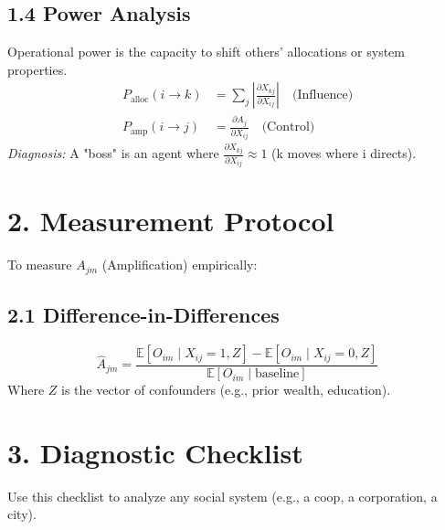 \documentclass{article}
\begin{document}
\subsection*{1.4 Power Analysis}
Operational power is the capacity to shift others' allocations or system properties.
\begin{align}
P_{\text{alloc}} (i \to k) &= \sum_j \left| \frac{\partial X_{kj}}{\partial X_{ij}} \right| \quad \text{(Influence)} \\
P_{\text{amp}} (i \to j) &= \frac{\partial A_j}{\partial X_{ij}} \quad \text{(Control)}
\end{align}
\textit{Diagnosis:} A "boss" is an agent where $\frac{\partial X_{kj}}{\partial X_{ij}} \approx 1$ (k moves where i directs).

\section*{2. Measurement Protocol}

To measure $A_{jm}$ (Amplification) empirically:

\subsection*{2.1 Difference-in-Differences}
\begin{equation}
\hat{A}_{jm} = \frac{\mathbb{E}[O_{im} \mid X_{ij}=1, Z] - \mathbb{E}[O_{im} \mid X_{ij}=0, Z]}{\mathbb{E}[O_{im} \mid \text{baseline}]}
\end{equation}
Where $Z$ is the vector of confounders (e.g., prior wealth, education).

\section*{3. Diagnostic Checklist}

Use this checklist to analyze any social system (e.g., a coop, a corporation, a city).
\end{document}
